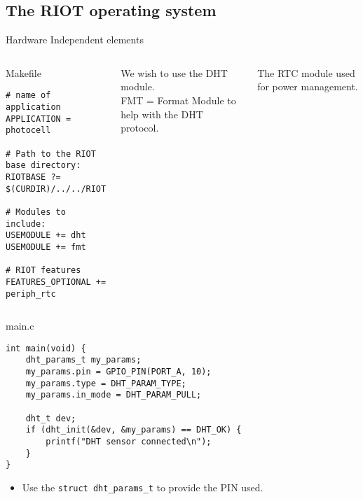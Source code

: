 \documentclass[aspectratio=169]{beamer}
\begin{document}
\subsection{The RIOT operating system}




\begin{frame}[fragile]{Hardware Independent elements}
\vspace{-.5cm}
\begin{columns}

\begin{exampleblock}{Makefile}
\begin{verbatim}
# name of application
APPLICATION = photocell

# Path to the RIOT base directory:
RIOTBASE ?= $(CURDIR)/../../RIOT

# Modules to include:
USEMODULE += dht
USEMODULE += fmt	

# RIOT features
FEATURES_OPTIONAL += periph_rtc
\end{verbatim}
\end{exampleblock}


\vspace{4.45cm}

We wish to use the \alert{DHT module}.\\
\alert{FMT} = Format Module to help with the DHT protocol.

\bigskip

The \alert{RTC} module used for power management.


\end{columns}
\vspace{4cm}
\end{frame}


\begin{frame}[fragile]{}

\begin{exampleblock}{main.c}
\begin{verbatim}
int main(void) {
    dht_params_t my_params;
    my_params.pin = GPIO_PIN(PORT_A, 10);
    my_params.type = DHT_PARAM_TYPE;
    my_params.in_mode = DHT_PARAM_PULL;

    dht_t dev;
    if (dht_init(&dev, &my_params) == DHT_OK) {
        printf("DHT sensor connected\n");
    }
}
\end{verbatim}
\end{exampleblock}

\begin{itemize}

\item Use the \texttt{struct dht_params_t} to provide the PIN used.

\end{itemize}

\vspace{2cm}
\end{frame}
\end{document}
